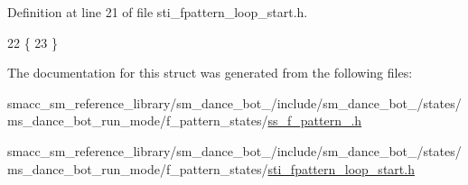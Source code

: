 Definition at line 21 of file sti\+\_\+fpattern\+\_\+loop\+\_\+start.\+h.


\begin{DoxyCode}
22   \{
23   \}
\end{DoxyCode}


The documentation for this struct was generated from the following files\+:\begin{DoxyCompactItemize}
\item 
smacc\+\_\+sm\+\_\+reference\+\_\+library/sm\+\_\+dance\+\_\+bot\+\_/include/sm\+\_\+dance\+\_\+bot\+\_/states/ms\+\_\+dance\+\_\+bot\+\_\+run\+\_\+mode/f\+\_\+pattern\+\_\+states/\hyperlink{2_2include_2sm__dance__bot__2_2states_2ms__dance__bot__run__mode_2f__pattern__states_2ss__f__pattern__1_8h}{ss\+\_\+f\+\_\+pattern\+\_.\+h}\item 
smacc\+\_\+sm\+\_\+reference\+\_\+library/sm\+\_\+dance\+\_\+bot\+\_/include/sm\+\_\+dance\+\_\+bot\+\_/states/ms\+\_\+dance\+\_\+bot\+\_\+run\+\_\+mode/f\+\_\+pattern\+\_\+states/\hyperlink{2_2include_2sm__dance__bot__2_2states_2ms__dance__bot__run__mode_2f__pattern__states_2sti__fpattern__loop__start_8h}{sti\+\_\+fpattern\+\_\+loop\+\_\+start.\+h}\end{DoxyCompactItemize}
